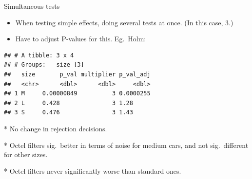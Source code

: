\documentclass[ignorenonframetext,]{beamer}
\newenvironment{Shaded}{\begin{snugshade}}{\end{snugshade}}
\newcommand{\DataTypeTok}[1]{\textcolor[rgb]{0.13,0.29,0.53}{#1}}
\newcommand{\DecValTok}[1]{\textcolor[rgb]{0.00,0.00,0.81}{#1}}
\newcommand{\KeywordTok}[1]{\textcolor[rgb]{0.13,0.29,0.53}{\textbf{#1}}}
\newcommand{\NormalTok}[1]{#1}
\newcommand{\OperatorTok}[1]{\textcolor[rgb]{0.81,0.36,0.00}{\textbf{#1}}}
\newcommand{\StringTok}[1]{\textcolor[rgb]{0.31,0.60,0.02}{#1}}
\begin{document}
\begin{frame}[fragile]{Simultaneous tests}
\protect\hypertarget{simultaneous-tests}{}

\begin{itemize}
\item
  When testing simple effects, doing several tests at once. (In this
  case, 3.)
\item
  Have to adjust P-values for this. Eg.~Holm:
\end{itemize}

\small

\begin{Shaded}
\end{Shaded}

\begin{verbatim}
## # A tibble: 3 x 4
## # Groups:   size [3]
##   size       p_val multiplier p_val_adj
##   <chr>      <dbl>      <dbl>     <dbl>
## 1 M     0.00000849          3 0.0000255
## 2 L     0.428               3 1.28     
## 3 S     0.476               3 1.43
\end{verbatim}

\normalsize

\begin{footnotesize}

* No change in rejection decisions.

* Octel filters sig.\ better in terms of noise for
medium cars, and not sig.\ different for other sizes.

* Octel filters never significantly worse than standard
ones. 
\end{footnotesize}

\end{frame}
\end{document}
